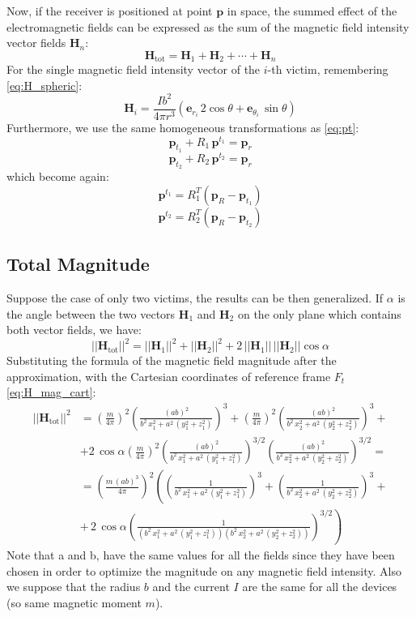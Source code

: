 Now, if the receiver is positioned at point \( \mathbf{p} \) in space, 
the summed effect of the electromagnetic fields can be expressed as the sum of the magnetic field intensity vector fields \(\mathbf{H}_n\):
\[
\mathbf{H}_{\text{tot}} = 
\mathbf{H}_1 + \mathbf{H}_2 + \cdots + \mathbf{H}_n
\]
For the single magnetic field intensity vector of the \(i\)-th victim, remembering \ref{eq:H_spheric}:
\[
\mathbf{H}_i = \frac{I b^2}{4\pi r^3} \left( \mathbf{e}_{r_i} \, 2 \cos \theta + \mathbf{e}_{\theta_i} \, \sin \theta \right)
\]
Furthermore, we use the same homogeneous transformations as \ref{eq:pt}:
\[
\mathbf{p}_{t_1} + R_1 \, \mathbf{p}^{t_1} = \mathbf{p}_r
\]
\[
\mathbf{p}_{t_2} + R_2 \, \mathbf{p}^{t_2} = \mathbf{p}_r
\]
which become again:
\[
\mathbf{p}^{t_1} = R_1^T \left( \mathbf{p}_R - \mathbf{p}_{t_1} \right)
\]
\[
\mathbf{p}^{t_2} = R_2^T \left( \mathbf{p}_R - \mathbf{p}_{t_2} \right)
\] 

\subsection{Total Magnitude }
Suppose the case of only two victims, the results can be then generalized.
If \( \alpha \) is the angle between the two vectors \( \mathbf{H}_1 \) and \( \mathbf{H}_2 \) on the only plane which contains both vector fields, we have:
\[
||\mathbf{H}_{\text{tot}}||^2 = ||\mathbf{H}_1||^2 + ||\mathbf{H}_2||^2 + 2 \, ||\mathbf{H}_1|| \, ||\mathbf{H}_2|| \cos \alpha
\]
Substituting the formula of the magnetic field magnitude after the approximation, with the Cartesian coordinates of reference frame $F_t$ \ref{eq:H_mag_cart}:
\[
\begin{aligned}
||\mathbf{H}_{\text{tot}}||^2 &= \left( \frac{m}{4 \pi} \right)^2 \left( \frac{(ab)^2}{b^2 \, x_1^2 + a^2 \, (y_1^2 + z_1^2)} \right)^3 
+ \left( \frac{m}{4 \pi} \right)^2 \left( \frac{(ab)^2}{b^2 \, x_2^2 + a^2 \, (y_2^2 + z_2^2)} \right)^3 + \\
& + 2 \, \cos \alpha \left( \frac{m}{4 \pi} \right)^2 \left( \frac{(ab)^2}{b^2 \, x_1^2 + a^2 \, (y_1^2 + z_1^2)} \right)^{3/2} \left( \frac{(ab)^2}{b^2 \, x_2^2 + a^2 \, (y_2^2 + z_2^2)} \right)^{3/2} = \\
&= \left( \frac{m \, (ab)^3}{4 \pi} \right)^2 \left( \left( \frac{1}{b^2 \, x_1^2 + a^2 \, (y_1^2 + z_1^2)} \right)^3 
+  \left( \frac{1}{b^2 \, x_2^2 + a^2 \, (y_2^2 + z_2^2)} \right)^3 \right. + \\
& \left. + \, 2 \, \cos \alpha \left( \frac{1}{(b^2 \, x_1^2 + a^2 \, (y_1^2 + z_1^2))(b^2 \, x_2^2 + a^2 \, (y_2^2 + z_2^2))} \right)^{3/2} \right)
\end{aligned}
\]
Note that a and b, have the same values for all the fields since they have been chosen in order to optimize the magnitude on any magnetic field intensity. 
Also we suppose that the radius $b$ and the current $I$ are the same for all the devices (so same magnetic moment $m$).


